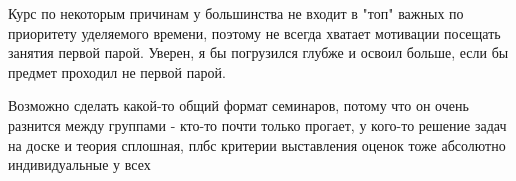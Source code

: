         \begin{commentbox}
            Курс по некоторым причинам у большинства не входит в "топ" важных по приоритету уделяемого времени, поэтому не всегда хватает мотивации посещать занятия первой парой. Уверен, я бы погрузился глубже и освоил больше, если бы предмет проходил не первой парой.
        \end{commentbox}

        \begin{commentbox}
            Возможно сделать какой-то общий формат семинаров, потому что он очень разнится между группами - кто-то почти только прогает, у кого-то решение задач на доске и теория сплошная, плбс критерии выставления оценок тоже абсолютно индивидуальные у всех
        \end{commentbox}